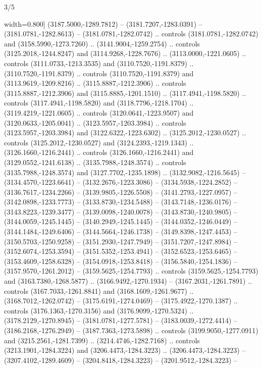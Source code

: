 \begin{flagdescription}{3/5}
\begin{scope}[xshift=0.5\flaglength,yshift=0.5\flagwidth,scale=\flagwidth/99]
\begin{scope}[y=0.8pt, x=0.8pt, yscale=-0.20628, xscale=0.20628,shift={(-500,-300)}]
\begin{scope}[cm={{0.79646,0.0,0.0,0.7753,(100.0721,273.79617)}}]
\begin{scope}[cm={{1.08438,0.0,0.0,1.08438,(-425.76596,333.57046)}}]
  width=0.800\lw] (3187.5000,-1289.7812) -- (3181.7207,-1283.0391) --
  (3181.0781,-1282.8613) -- (3181.0781,-1282.0742) .. controls
  (3181.0781,-1282.0742) and (3158.5990,-1273.7260) .. (3141.9004,-1259.2754) ..
  controls (3125.2018,-1244.8247) and (3114.9268,-1228.7676) ..
  (3113.0000,-1221.0605) .. controls (3111.0733,-1213.3535) and
  (3110.7520,-1191.8379) .. (3110.7520,-1191.8379) .. controls
  (3110.7520,-1191.8379) and (3113.9619,-1209.8216) .. (3115.8887,-1212.3906) ..
  controls (3115.8887,-1212.3906) and (3115.8885,-1201.1510) ..
  (3117.4941,-1198.5820) .. controls (3117.4941,-1198.5820) and
  (3118.7796,-1218.1704) .. (3119.4219,-1221.0605) .. controls
  (3120.0641,-1223.9507) and (3120.0633,-1205.0041) .. (3123.5957,-1203.3984) ..
  controls (3123.5957,-1203.3984) and (3122.6322,-1223.6302) ..
  (3125.2012,-1230.0527) .. controls (3125.2012,-1230.0527) and
  (3124.2393,-1219.1343) .. (3126.1660,-1216.2441) .. controls
  (3126.1660,-1216.2441) and (3129.0552,-1241.6138) .. (3135.7988,-1248.3574) ..
  controls (3135.7988,-1248.3574) and (3127.7702,-1235.1898) ..
  (3132.9082,-1216.5645) -- (3134.4570,-1223.6641) -- (3132.2676,-1223.3086) --
  (3134.5938,-1224.2852) -- (3136.7617,-1234.2266) -- (3139.9805,-1226.5508) --
  (3141.2793,-1227.0957) -- (3142.0898,-1233.7773) -- (3133.8730,-1234.5488) --
  (3143.7148,-1236.0176) -- (3143.8223,-1239.3477) -- (3139.0098,-1240.0078) --
  (3143.8730,-1240.9805) -- (3144.0059,-1245.1445) -- (3140.2949,-1245.1445) --
  (3144.0352,-1246.0449) -- (3144.1484,-1249.6406) -- (3144.5664,-1246.1738) --
  (3149.8398,-1247.4453) -- (3150.5703,-1250.9258) -- (3151.2930,-1247.7949) --
  (3151.7207,-1247.8984) -- (3152.6074,-1253.3594) -- (3151.5352,-1253.4941) --
  (3152.6523,-1253.6465) -- (3153.4609,-1258.6328) -- (3154.0918,-1253.8418) --
  (3156.5840,-1254.1836) -- (3157.9570,-1261.2012) -- (3159.5625,-1254.7793) ..
  controls (3159.5625,-1254.7793) and (3163.7380,-1268.5877) ..
  (3166.9492,-1270.1934) -- (3167.2031,-1261.7891) .. controls
  (3167.7033,-1261.8841) and (3168.1609,-1261.9677) .. (3168.7012,-1262.0742) --
  (3175.6191,-1274.0469) -- (3175.4922,-1270.1387) .. controls
  (3176.1363,-1270.3156) and (3176.9099,-1270.5324) .. (3178.2129,-1270.8945) --
  (3181.0781,-1277.5781) -- (3183.0039,-1272.4414) -- (3186.2168,-1276.2949) --
  (3187.7363,-1273.5898) .. controls (3199.9050,-1277.0911) and
  (3215.2561,-1281.7399) .. (3214.4746,-1282.7168) .. controls
  (3213.1901,-1284.3224) and (3206.4473,-1284.3223) .. (3206.4473,-1284.3223) --
  (3207.4102,-1289.4609) -- (3204.8418,-1284.3223) -- (3201.9512,-1284.3223) --

\end{scope}
\end{scope}
\end{scope}
\end{scope}
\end{flagdescription}
